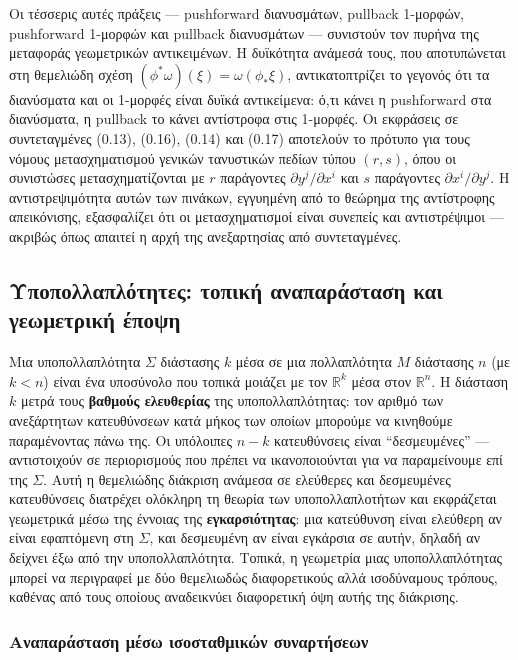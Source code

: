 \documentclass[12pt]{article}
\begin{document}
Οι τέσσερις αυτές πράξεις --- pushforward διανυσμάτων, pullback 1-μορφών, pushforward 1-μορφών και pullback διανυσμάτων --- συνιστούν τον πυρήνα της μεταφοράς γεωμετρικών αντικειμένων. Η δυϊκότητα ανάμεσά τους, που αποτυπώνεται στη θεμελιώδη σχέση $(\phi^* \omega)(\xi) = \omega(\phi_* \xi)$, αντικατοπτρίζει το γεγονός ότι τα διανύσματα και οι 1-μορφές είναι δυϊκά αντικείμενα: ό,τι κάνει η pushforward στα διανύσματα, η pullback το κάνει αντίστροφα στις 1-μορφές. Οι εκφράσεις σε συντεταγμένες (0.13), (0.16), (0.14) και (0.17) αποτελούν το πρότυπο για τους νόμους μετασχηματισμού γενικών τανυστικών πεδίων τύπου $(r, s)$, όπου οι συνιστώσες μετασχηματίζονται με $r$ παράγοντες $\partial y^j / \partial x^i$ και $s$ παράγοντες $\partial x^i / \partial y^j$. Η αντιστρεψιμότητα αυτών των πινάκων, εγγυημένη από το θεώρημα της αντίστροφης απεικόνισης, εξασφαλίζει ότι οι μετασχηματισμοί είναι συνεπείς και αντιστρέψιμοι --- ακριβώς όπως απαιτεί η αρχή της ανεξαρτησίας από συντεταγμένες.

\subsection{Υποπολλαπλότητες: τοπική αναπαράσταση και γεωμετρική έποψη}

Μια υποπολλαπλότητα $\Sigma$ διάστασης $k$ μέσα σε μια πολλαπλότητα $M$ διάστασης $n$ (με $k < n$) είναι ένα υποσύνολο που τοπικά μοιάζει με τον $\mathbb{R}^k$ μέσα στον $\mathbb{R}^n$. Η διάσταση $k$ μετρά τους \textbf{βαθμούς ελευθερίας} της υποπολλαπλότητας: τον αριθμό των ανεξάρτητων κατευθύνσεων κατά μήκος των οποίων μπορούμε να κινηθούμε παραμένοντας πάνω της. Οι υπόλοιπες $n-k$ κατευθύνσεις είναι ``δεσμευμένες'' --- αντιστοιχούν σε περιορισμούς που πρέπει να ικανοποιούνται για να παραμείνουμε επί της $\Sigma$. Αυτή η θεμελιώδης διάκριση ανάμεσα σε ελεύθερες και δεσμευμένες κατευθύνσεις διατρέχει ολόκληρη τη θεωρία των υποπολλαπλοτήτων και εκφράζεται γεωμετρικά μέσω της έννοιας της \textbf{εγκαρσιότητας}: μια κατεύθυνση είναι ελεύθερη αν είναι εφαπτόμενη στη $\Sigma$, και δεσμευμένη αν είναι εγκάρσια σε αυτήν, δηλαδή αν δείχνει έξω από την υποπολλαπλότητα. Τοπικά, η γεωμετρία μιας υποπολλαπλότητας μπορεί να περιγραφεί με δύο θεμελιωδώς διαφορετικούς αλλά ισοδύναμους τρόπους, καθένας από τους οποίους αναδεικνύει διαφορετική όψη αυτής της διάκρισης.

\subsubsection{Αναπαράσταση μέσω ισοσταθμικών συναρτήσεων}
\end{document}
